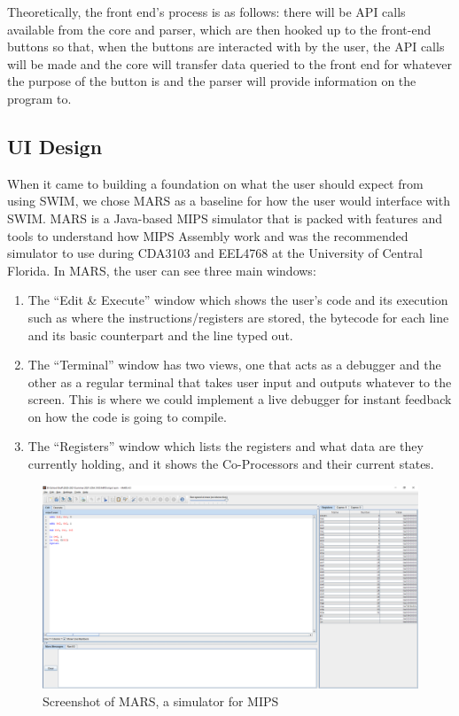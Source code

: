 \documentclass[
    paper=letter,
    parskip=half,
    fontsize=12pt,
    titlepage=firstiscover,
    toc=bibliography,
    numbers=endperiod
]{scrartcl}
\providecommand{\tightlist}{%
  \setlength{\itemsep}{0pt}\setlength{\parskip}{0pt}}
\begin{document}
Theoretically, the front end's process is as follows: there will be API
calls available from the core and parser, which are then hooked up to
the front-end buttons so that, when the buttons are interacted with by
the user, the API calls will be made and the core will transfer data
queried to the front end for whatever the purpose of the button is and
the parser will provide information on the program to.

\subsection{UI Design}
\label{subsec:ui-design}

When it came to building a foundation on what the user should expect
from using SWIM, we chose MARS as a baseline for how the user would
interface with SWIM. MARS is a Java-based MIPS simulator that is packed
with features and tools to understand how MIPS Assembly work and was the
recommended simulator to use during CDA3103 and EEL4768 at the
University of Central Florida. In MARS, the user can see three main
windows:

\begin{enumerate}
    \tightlist
    \item The ``Edit \& Execute'' window which shows the user's code and its
          execution such as where the instructions/registers are stored, the
          bytecode for each line and its basic counterpart and the line typed out.
    \item The ``Terminal'' window has two views, one that acts as a debugger and
          the other as a regular terminal that takes user input and outputs
          whatever to the screen. This is where we could implement a live debugger
          for instant feedback on how the code is going to compile.
    \item The ``Registers'' window which lists the registers and what data are
          they currently holding, and it shows the Co-Processors and their current
          states.
\end{enumerate}

\begin{figure}[H]
    \includegraphics[width=\textwidth]{mars}
    \caption{Screenshot of MARS, a simulator for MIPS}
    \label{fig:mars}
\end{figure}
\end{document}
